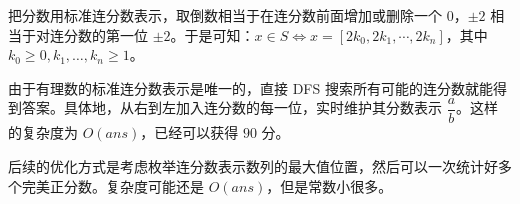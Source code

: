 \documentclass[../main.tex]{subfiles}
\begin{document}
\begin{frame}
把分数用标准连分数表示，取倒数相当于在连分数前面增加或删除一个 $0$，$\pm 2$ 相当于对连分数的第一位 $\pm 2$。于是可知：$x\in S\iff x=[2k_0,2k_1,\cdots,2k_n]$，其中 $k_0\ge 0,k_1,\dots,k_n\ge 1$。\pause

由于有理数的标准连分数表示是唯一的，直接 DFS 搜索所有可能的连分数就能得到答案。具体地，从右到左加入连分数的每一位，实时维护其分数表示 $\dfrac{a}{b}$。这样的复杂度为 $O(ans)$，已经可以获得 $90$ 分。\pause

后续的优化方式是考虑枚举连分数表示数列的最大值位置，然后可以一次统计好多个完美正分数。复杂度可能还是 $O(ans)$，但是常数小很多。
\end{frame}
\end{document}

